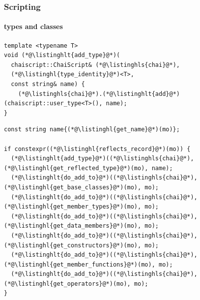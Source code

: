 \documentclass[aspectratio=169,compress,table,xcolor=table]{beamer}
\begin{document}
\begin{frame}[fragile]
  \frametitle{Scripting}
  \framesubtitle{types and classes}
  \begin{lstlisting}[language=c++2x,basicstyle=\footnotesize\ttfamily]
template <typename T>
void (*@\listinghlt{add_type}@*)(
  chaiscript::ChaiScript& (*@\listinghls{chai}@*),
  (*@\listinghl{type_identity}@*)<T>,
  const string& name) {
    (*@\listinghls{chai}@*).(*@\listinghlt{add}@*)(chaiscript::user_type<T>(), name);
}
  \end{lstlisting}
  \begin{lstlisting}[language=c++2x,basicstyle=\footnotesize\ttfamily]
const string name{(*@\listinghl{get_name}@*)(mo)};

if constexpr((*@\listinghl{reflects_record}@*)(mo)) {
  (*@\listinghlt{add_type}@*)((*@\listinghls{chai}@*),  (*@\listinghl{get_reflected_type}@*)(mo), name);
  (*@\listinghlt{do_add_to}@*)((*@\listinghls{chai}@*), (*@\listinghl{get_base_classes}@*)(mo), mo);
  (*@\listinghlt{do_add_to}@*)((*@\listinghls{chai}@*), (*@\listinghl{get_member_types}@*)(mo), mo);
  (*@\listinghlt{do_add_to}@*)((*@\listinghls{chai}@*), (*@\listinghl{get_data_members}@*)(mo), mo);
  (*@\listinghlt{do_add_to}@*)((*@\listinghls{chai}@*), (*@\listinghl{get_constructors}@*)(mo), mo);
  (*@\listinghlt{do_add_to}@*)((*@\listinghls{chai}@*), (*@\listinghl{get_member_functions}@*)(mo), mo);
  (*@\listinghlt{do_add_to}@*)((*@\listinghls{chai}@*), (*@\listinghl{get_operators}@*)(mo), mo);
}
  \end{lstlisting}
\end{frame}
\end{document}
